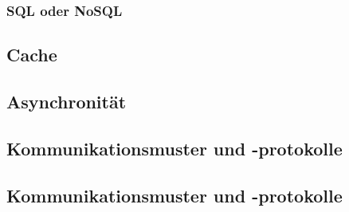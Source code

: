 \documentclass[../main.tex]{subfiles}
\begin{document}
	\subsubsection{SQL oder NoSQL}
	\clearpage

	\subsection{Cache}
	\clearpage
	
	\subsection{Asynchronität}
	\clearpage
	
	\subsection{Kommunikationsmuster und -protokolle}
	\clearpage
	
	\subsection{Kommunikationsmuster und -protokolle}
	\clearpage
	
\end{document}
